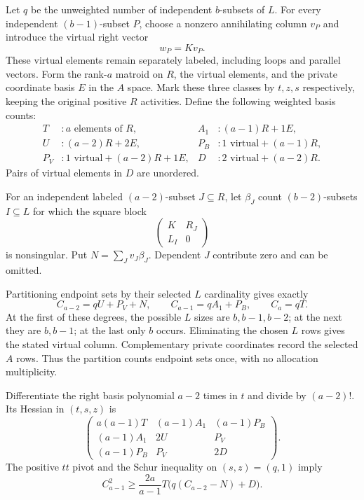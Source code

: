 \documentclass[11pt,a4paper]{article}
\theoremstyle{remark}\newtheorem{remark}[theorem]{Remark}
\begin{document}
Let $q$ be the unweighted number of independent $b$-subsets of $L$. For every independent $(b-1)$-subset $P$, choose a nonzero annihilating column $v_P$ and introduce the virtual right vector
\[
 w_P=Kv_P.
\]
These virtual elements remain separately labeled, including loops and parallel vectors. Form the rank-$a$ matroid on $R$, the virtual elements, and the private coordinate basis $E$ in the $A$ space. Mark these three classes by $t,z,s$ respectively, keeping the original positive $R$ activities. Define the following weighted basis counts:
\begin{align*}
 T &: a\text{ elements of }R, &
 A_1 &: (a-1)R+1E,\\
 U &: (a-2)R+2E, &
 P_B &: 1\text{ virtual}+(a-1)R,\\
 P_V &:1\text{ virtual}+(a-2)R+1E, &
 D &:2\text{ virtual}+(a-2)R.
\end{align*}
Pairs of virtual elements in $D$ are unordered.

For an independent labeled $(a-2)$-subset $J\subseteq R$, let $\beta_J$ count $(b-2)$-subsets $I\subseteq L$ for which the square block
\begin{equation}\label{mrn:e:tg:eq:block}
 \begin{pmatrix}K&R_J\\L_I&0\end{pmatrix}
\end{equation}
is nonsingular. Put $N=\sum_J v_J\beta_J$. Dependent $J$ contribute zero and can be omitted.

Partitioning endpoint sets by their selected $L$ cardinality gives exactly
\begin{equation}\label{mrn:e:tg:eq:sectors}
 C_{a-2}=qU+P_V+N,\qquad C_{a-1}=qA_1+P_B,
 \qquad C_a=qT.
\end{equation}
At the first of these degrees, the possible $L$ sizes are $b,b-1,b-2$; at the next they are $b,b-1$; at the last only $b$ occurs. Eliminating the chosen $L$ rows gives the stated virtual column. Complementary private coordinates record the selected $A$ rows. Thus the partition counts endpoint sets once, with no allocation multiplicity.

Differentiate the right basis polynomial $a-2$ times in $t$ and divide by $(a-2)!$. Its Hessian in $(t,s,z)$ is
\begin{equation}\label{mrn:e:tg:eq:rightH}
 \begin{pmatrix}
 a(a-1)T&(a-1)A_1&(a-1)P_B\\
 (a-1)A_1&2U&P_V\\
 (a-1)P_B&P_V&2D
 \end{pmatrix}.
\end{equation}
The positive $tt$ pivot and the Schur inequality on $(s,z)=(q,1)$ imply
\begin{equation}\label{mrn:e:tg:eq:rightbound}
 C_{a-1}^2\ge\frac{2a}{a-1}T\bigl(q(C_{a-2}-N)+D\bigr).
\end{equation}
\end{document}
